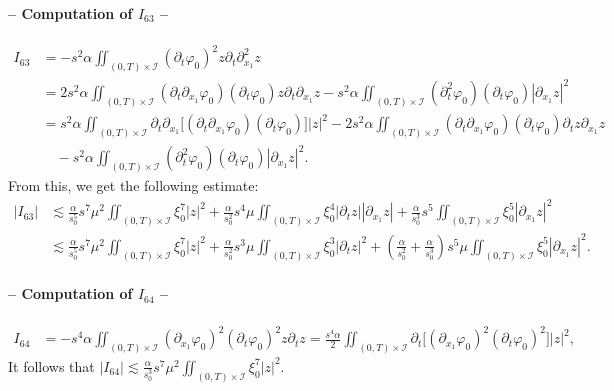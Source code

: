 \documentclass[a4paper, 12pt]{article}
\theoremstyle{plain}
\theoremstyle{definition}
\numberwithin{theorem}{section}
\numberwithin{equation}{section}
\begin{document}
{\paragraph{-- Computation of $I_{63}$ --}
\begin{align*}
I_{63}&=-s^2\alpha\iint_{(0,T)\times\mathcal{I}}(\partial_t\varphi_0)^2z\partial_t\partial^2_{x_1}z\\
&=2s^2\alpha\iint_{(0,T)\times\mathcal{I}}(\partial_t\partial_{x_1}\varphi_0)(\partial_t\varphi_0)z\partial_t\partial_{x_1}z-s^2\alpha\iint_{(0,T)\times\mathcal{I}}(\partial^2_t\varphi_0)(\partial_t\varphi_0)|\partial_{x_1}z|^2\\
&=s^2\alpha\iint_{(0,T)\times\mathcal{I}}\partial_t\partial_{x_1}\big[(\partial_t\partial_{x_1}\varphi_0)(\partial_t\varphi_0)\big]|z|^2-2s^2\alpha \iint_{(0,T)\times\mathcal{I}}(\partial_t\partial_{x_1}\varphi_0)(\partial_t\varphi_0)\partial_tz\partial_{x_1}z\\
&\quad -s^2\alpha\iint_{(0,T)\times\mathcal{I}}(\partial^2_t\varphi_0)(\partial_t\varphi_0)|\partial_{x_1}z|^2.
\end{align*}
From this, we get the following estimate:
\begin{align*}
|I_{63}|& \lesssim \frac{\alpha}{s_0^5} s^7\mu^2\iint_{(0,T)\times\mathcal{I}}\xi_0^7|z|^2+\frac{\alpha}{s_0^2} s^4\mu\iint_{(0,T)\times\mathcal{I}}\xi_0^4|\partial_tz||\partial_{x_1}z|+\frac{\alpha}{s_0^3} s^5\iint_{(0,T)\times\mathcal{I}}\xi_0^5|\partial_{x_1}z|^2\\
& \lesssim \frac{\alpha}{s_0^5} s^7\mu^2\iint_{(0,T)\times\mathcal{I}}\xi_0^7|z|^2+\frac{\alpha}{s_0^2} s^3\mu\iint_{(0,T)\times\mathcal{I}}\xi_0^3|\partial_tz|^2+\left(\frac{\alpha}{s_0^2}+\frac{\alpha}{s_0^3}\right) s^5\mu\iint_{(0,T)\times\mathcal{I}}\xi_0^5|\partial_{x_1}z|^2.
\end{align*}
\paragraph{-- Computation of $I_{64}$ --}
\begin{align*}
I_{64}&=-s^4\alpha\iint_{(0,T)\times\mathcal{I}}(\partial_{x_1}\varphi_0)^2(\partial_t\varphi_0)^2z\partial_tz=\frac{s^4\alpha}{2}\iint_{(0,T)\times\mathcal{I}}\partial_t\big[(\partial_{x_1}\varphi_0)^2(\partial_t\varphi_0)^2\big]|z|^2,
\end{align*}
It follows that
$ \displaystyle
|I_{64}| \lesssim \frac{\alpha}{s_0^3} s^7\mu^2\iint_{(0,T)\times\mathcal{I}}\xi_0^7|z|^2.
$
}
\end{document}

